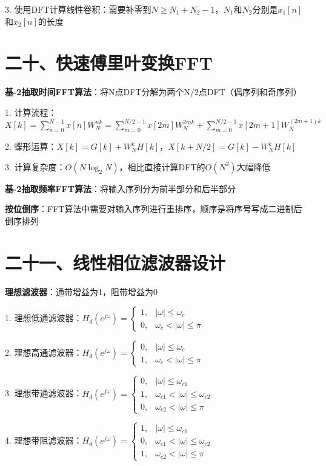 3. 使用DFT计算线性卷积：需要补零到$N \geq N_1 + N_2 - 1$，$N_1$和$N_2$分别是$x_1[n]$和$x_2[n]$的长度

\section*{二十、快速傅里叶变换FFT}

\textbf{基-2抽取时间FFT算法}：将N点DFT分解为两个N/2点DFT（偶序列和奇序列）

1. 计算流程：$X[k] = \sum_{n=0}^{N-1}x[n]W_N^{nk} = \sum_{m=0}^{N/2-1}x[2m]W_N^{2mk} + \sum_{m=0}^{N/2-1}x[2m+1]W_N^{(2m+1)k}$

2. 蝶形运算：$X[k] = G[k] + W_N^k H[k]$，$X[k+N/2] = G[k] - W_N^k H[k]$

3. 计算复杂度：$O(N \log_2 N)$，相比直接计算DFT的$O(N^2)$大幅降低

\textbf{基-2抽取频率FFT算法}：将输入序列分为前半部分和后半部分

\textbf{按位倒序}：FFT算法中需要对输入序列进行重排序，顺序是将序号写成二进制后倒序排列

\section*{二十一、线性相位滤波器设计}

\textbf{理想滤波器}：通带增益为1，阻带增益为0

1. 理想低通滤波器：$H_d(e^{j\omega}) = \begin{cases} 1, & |\omega| \leq \omega_c \\ 0, & \omega_c < |\omega| \leq \pi \end{cases}$

2. 理想高通滤波器：$H_d(e^{j\omega}) = \begin{cases} 0, & |\omega| \leq \omega_c \\ 1, & \omega_c < |\omega| \leq \pi \end{cases}$

3. 理想带通滤波器：$H_d(e^{j\omega}) = \begin{cases} 0, & |\omega| \leq \omega_{c1} \\ 1, & \omega_{c1} < |\omega| \leq \omega_{c2} \\ 0, & \omega_{c2} < |\omega| \leq \pi \end{cases}$

4. 理想带阻滤波器：$H_d(e^{j\omega}) = \begin{cases} 1, & |\omega| \leq \omega_{c1} \\ 0, & \omega_{c1} < |\omega| \leq \omega_{c2} \\ 1, & \omega_{c2} < |\omega| \leq \pi \end{cases}$


